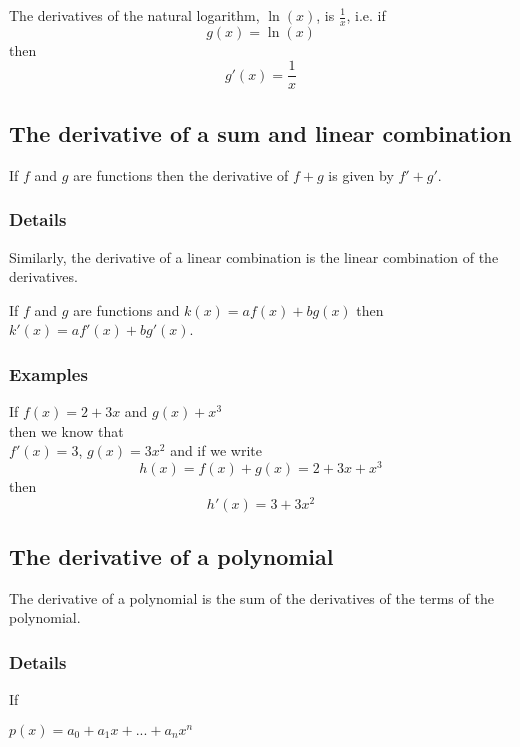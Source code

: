 \documentclass[12pt,a4paper]{article}
\theoremstyle{regla}
\theoremstyle{remark}
\theoremstyle{definition}
\theoremstyle{nonumberbreak}
\begin{document}
The derivatives of the natural logarithm, $\ln(x)$, is $\frac{1}{x}$, i.e.
if	
	$$g(x) = \ln(x)$$
then
	$$g'(x) = \frac{1}{x}$$


\subsection{The derivative of a sum and linear combination}
\begin{fbox}
\begin{minipage}{0.97\textwidth}
If $f$ and $g$ are functions then the derivative of $f+g$ is given by $f' + g'$. 
\end{minipage}
\end{fbox}
\subsubsection{Details}
Similarly, the derivative of a linear combination is the linear combination of the derivatives.

If $f$ and $g$ are functions and $k(x)=af(x) + bg(x)$ then $k'(x)=af'(x)+ bg'(x)$.
\subsubsection{Examples}
\begin{xmpl}
If $f(x) = 2+3x$ and $g(x)+x^3$ \\
then we know that\\ 
$f'(x)=3$, $g(x)=3x^2$
 and if we write 
$$h(x)=f(x)+g(x)=2+3x+x^3$$
 then 
$$h'(x)=3+3x^2$$
\end{xmpl}

\subsection{The derivative of a polynomial}
\begin{fbox}
\begin{minipage}{0.97\textwidth}
The derivative of a polynomial is the sum of the derivatives of the terms of the polynomial.
\end{minipage}
\end{fbox}
\subsubsection{Details}
If 

$p(x)=a_0+a_1x+...+a_n x^n$
\end{document}
